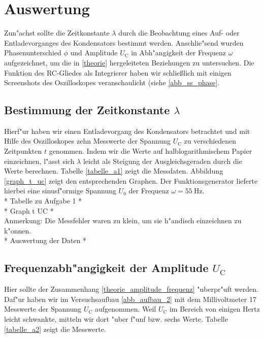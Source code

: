 \documentclass{scrartcl}
\begin{document}
	\section{Auswertung}

		Zun"achst sollte die Zeitkonstante $\lambda$ durch die Beobachtung eines Auf- oder Entladevorganges des Kondensators bestimmt werden.
		Anschlie"send wurden Phasenunterschied $\phi$ und Amplitude $U_{\mathrm{C}}$ in Abh"angigkeit der Frequenz $\omega$ aufgezeichnet, um die in \ref{theorie} hergeleiteten Beziehungen zu untersuchen.
		Die Funktion des RC-Gliedes als Integrierer haben wir schließlich mit einigen Screenshots des Oszilloskopes veranschaulicht (siehe \ref{abb_ss_phase}.

		\subsection{Bestimmung der Zeitkonstante $\lambda$}

			Hierf"ur haben wir einen Entladevorgang des Kondensators betrachtet und mit Hilfe des Oszilloskopes
			zehn Messwerte der Spannung $U_{\mathrm{C}}$ zu verschiedenen Zeitpunkten $t$ genommen.
			Indem wir die Werte auf halblogarithmischem Papier einzeichnen, l"asst sich $\lambda$ leicht als Steigung der Ausgleichsgeraden durch die Werte berechnen.
			Tabelle \ref{tabelle_a1} zeigt die Messdaten.
			Abbildung \ref{graph_t_uc} zeigt den entsprechenden Graphen. Der Funktionsgenerator lieferte hierbei eine sinusf"ormige Spannung $U_0$ der Frequenz $\omega = \SI{55}{\hertz}$.\\

			* Tabelle zu Aufgabe 1 * \\

			* Graph t UC * \\

			Anmerkung: Die Messfehler waren zu klein, um sie h"andisch einzeichnen zu k"onnen.\\

			* Auswertung der Daten * 

		\subsection{Frequenzabh"angigkeit der Amplitude $U_{\mathrm{C}}$}

			Hier sollte der Zusammenhang \ref{theorie_amplitude_frequenz} "uberpr"uft werden.
			Daf"ur haben wir im Versuchsaufbau \ref{abb_aufbau_2} mit dem Millivoltmeter 17 Messwerte der Spannung $U_{\mathrm{C}}$ aufgenommen.
			Weil $U_{\mathrm{C}}$ im Bereich von einigen Hertz leicht schwankte,
			mitteln wir dort "uber f"unf bzw. sechs Werte.
			Tabelle \ref{tabelle_a2} zeigt die Messwerte.\\
\end{document}
